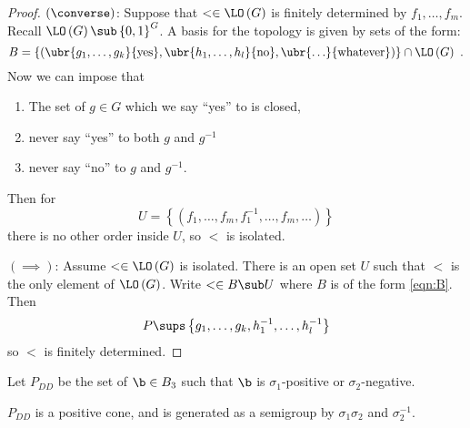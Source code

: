 \begin{proof}
$\left(\converse\right)$: Suppose that $< \in \LO\left(G\right)$ is finitely determined by
$f_1 , \ldots ,f_m$.
Recall $\LO\left(G\right)\sub \left\{0,1\right\}^G$. 
A basis for the topology is given by sets of the form:
\begin{equation}
B = \left\{ \left(\ubr{g_1 , \ldots , g_k}{\text{yes}} , \ubr{h_1 , \ldots ,
h_l}{\text{no}} , \ubr{\ldots}{\text{whatever}}\right)\right\}
\cap \LO\left(G\right) \ .
\label{eqn:B}
\end{equation}
Now we can impose that
\begin{enumerate}
\item The set of $g\in G$ which we say ``yes'' to is closed,
\item never say ``yes'' to both $g$ and $g^{-1}$
\item never say ``no'' to $g$ and $g^{-1}$.
\end{enumerate}
Then for
\begin{equation}
U = \left\{\left(f_1 , \ldots , f_m , f_1^{-1} , \ldots , f_m , \ldots\right)\right\}
\end{equation}
there is no other order inside $U$, so $<$ is isolated.

$\left(\implies\right)$: Assume $< \in \LO\left(G\right)$ is isolated. There is an open
set $U$ such that $<$ is the only element of $\LO\left(G\right)$. Write $<\in B\sub U$
where $B$ is of the form \eqref{eqn:B}. Then 
\begin{equation}
P\sups \left\{g_1 , \ldots , g_k , h_1^{-1} , \ldots , h_l^{-1}\right\}
\end{equation}
so $<$ is finitely determined.
\end{proof}

\begin{defn}
Let $P_{DD}$ be the set of $\b\in B_3$ such that $\b$ is $\sigma_1$-positive or
$\sigma_2$-negative.
\end{defn}

\begin{thm}
$P_{DD}$ is a positive cone, and is generated as a semigroup by $\sigma_1 \sigma_2$ and
$\sigma_2^{-1}$.
\end{thm}

